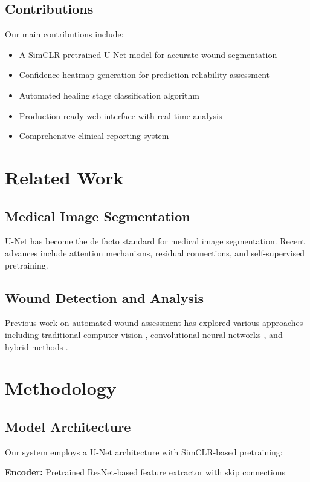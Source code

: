 \documentclass[conference]{IEEEtran}
\begin{document}
\subsection{Contributions}
Our main contributions include:
\begin{itemize}
    \item A SimCLR-pretrained U-Net model for accurate wound segmentation
    \item Confidence heatmap generation for prediction reliability assessment
    \item Automated healing stage classification algorithm
    \item Production-ready web interface with real-time analysis
    \item Comprehensive clinical reporting system
\end{itemize}

\section{Related Work}
\subsection{Medical Image Segmentation}
U-Net \cite{ronneberger2015unet} has become the de facto standard for medical image segmentation. Recent advances include attention mechanisms, residual connections, and self-supervised pretraining.

\subsection{Wound Detection and Analysis}
Previous work on automated wound assessment has explored various approaches including traditional computer vision \cite{example1}, convolutional neural networks \cite{example2}, and hybrid methods \cite{example3}.

\section{Methodology}

\subsection{Model Architecture}
Our system employs a U-Net architecture with SimCLR-based pretraining:

\textbf{Encoder:} Pretrained ResNet-based feature extractor with skip connections
\end{document}
